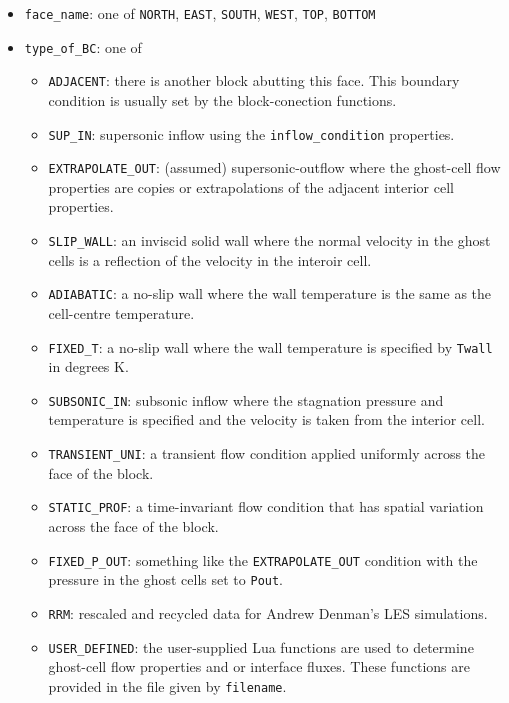 \begin{itemize}
  \item \texttt{face\_name}: one of \texttt{NORTH}, \texttt{EAST},
    \texttt{SOUTH}, \texttt{WEST}, \texttt{TOP}, \texttt{BOTTOM}
  \item \texttt{type\_of\_BC}: one of 
    \begin{itemize}
      \item \texttt{ADJACENT}: there is another block abutting this face.
        This boundary condition is usually set by the block-conection functions.
      \item \texttt{SUP\_IN}: supersonic inflow using the
        \texttt{inflow\_condition} properties.
      \item \texttt{EXTRAPOLATE\_OUT}: (assumed) supersonic-outflow where the
        ghost-cell flow properties are copies or extrapolations 
        of the adjacent interior cell properties.
      \item \texttt{SLIP\_WALL}: an inviscid solid wall where the normal
        velocity in the ghost cells is a reflection of the velocity in the
        interoir cell.
      \item \texttt{ADIABATIC}: a no-slip wall where the wall temperature is
        the same as the cell-centre temperature.
      \item \texttt{FIXED\_T}: a no-slip wall where the wall temperature is
        specified by \texttt{Twall} in degrees K.
      \item \texttt{SUBSONIC\_IN}: subsonic inflow where the stagnation
        pressure and temperature is specified and the velocity is taken from
        the interior cell.
      \item \texttt{TRANSIENT\_UNI}: a transient flow condition applied
        uniformly across the face of the block.
      \item \texttt{STATIC\_PROF}: a time-invariant flow condition that has
        spatial variation across the face of the block.
      \item \texttt{FIXED\_P\_OUT}: something like the \texttt{EXTRAPOLATE\_OUT}
        condition with the pressure in the ghost cells set to \texttt{Pout}.
      \item \texttt{RRM}: rescaled and recycled data for Andrew Denman's LES simulations.
      \item \texttt{USER\_DEFINED}: the user-supplied Lua functions are used to
        determine ghost-cell flow properties and or interface fluxes.
        These functions are provided in the file given by \texttt{filename}.

\end{itemize}
\end{itemize}

